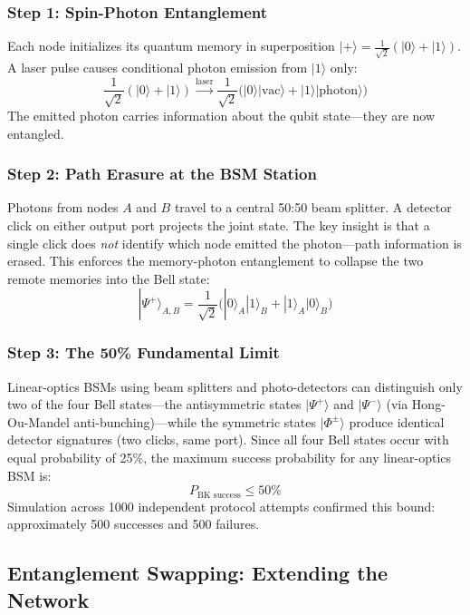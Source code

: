 \documentclass[12pt,oneside,letterpaper,english]{article}
\begin{document}
\subsubsection{Step 1: Spin-Photon Entanglement}
Each node initializes its quantum memory in superposition $|+\rangle = \frac{1}{\sqrt{2}}(|0\rangle + |1\rangle)$. A laser pulse causes conditional photon emission from $|1\rangle$ only:
\begin{equation}
    \frac{1}{\sqrt{2}}(|0\rangle + |1\rangle) \xrightarrow{\text{laser}} \frac{1}{\sqrt{2}}\bigl(|0\rangle|\text{vac}\rangle + |1\rangle|\text{photon}\rangle\bigr)
\end{equation}
The emitted photon carries information about the qubit state—they are now entangled.

\subsubsection{Step 2: Path Erasure at the BSM Station}
Photons from nodes $A$ and $B$ travel to a central 50:50 beam splitter. A detector click on either output port projects the joint state. The key insight is that a single click does \emph{not} identify which node emitted the photon—path information is erased. This enforces the memory-photon entanglement to collapse the two remote memories into the Bell state:
\begin{equation}
    |\Psi^+\rangle_{A,B} = \frac{1}{\sqrt{2}}\bigl(|0\rangle_A|1\rangle_B + |1\rangle_A|0\rangle_B\bigr)
\end{equation}

\subsubsection{Step 3: The 50\% Fundamental Limit}
Linear-optics BSMs using beam splitters and photo-detectors can distinguish only two of the four Bell states—the antisymmetric states $|\Psi^+\rangle$ and $|\Psi^-\rangle$ (via Hong-Ou-Mandel anti-bunching)—while the symmetric states $|\Phi^\pm\rangle$ produce identical detector signatures (two clicks, same port). Since all four Bell states occur with equal probability of 25\%, the maximum success probability for any linear-optics BSM is:
\begin{equation}
    P_{\text{BK success}} \leq 50\%
\end{equation}
Simulation across 1000 independent protocol attempts confirmed this bound: approximately 500 successes and 500 failures.

\subsection{Entanglement Swapping: Extending the Network}
\end{document}

